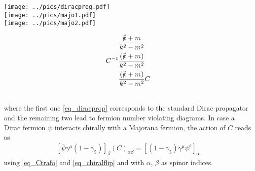 \begin{minipage}{0.49\textwidth}
 \texttt{[image: ../pics/diracprog.pdf]}\\
 \texttt{[image: ../pics/majo1.pdf]}\\
 \texttt{[image: ../pics/majo2.pdf]}
\end{minipage}
\begin{minipage}{0.45\textwidth}
\begin{align}
\hspace*{-25cm}&\frac{\slashed{k}+m}{k^2-m^2}\label{eq_diracprop}\\
 C^{-1}&\frac{(\slashed{k}+m)}{k^2-m^2}\label{eq_majproptowards}\\
 &\frac{(\slashed{k}+m)}{k^2-m^2}C\label{eq_majpropoutwards}
\end{align}
\end{minipage}
\\
\noindent where the first one \eqref{eq_diracprop} corresponds to the standard Dirac propagator and the remaining two lead to fermion number 
violating diagrams. In case a Dirac fermion $\psi$ interacts chirally with a Majorana fermion, the action of $C$ reads as \cite{Langacker}
\begin{align}
 \left[\bar\psi \gamma^\mu (1-\gamma_5)\right]_\beta (C)_{\alpha\beta} = \left[(1-\gamma_5)\gamma^\mu \psi^c\right]_\alpha
 \label{eq_DirMaj}
\end{align}
using \eqref{eq_Ctrafo} and \eqref{eq_chiralflip} and with $\alpha$, $\beta$ as spinor indices. 


